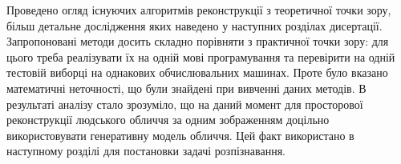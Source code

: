 \chapterConclusion

Проведено огляд існуючих алгоритмів реконструкції
з теоретичної точки зору,
більш детальне дослідження яких наведено у наступних розділах дисертації.
Запропоновані методи досить складно порівняти з практичної точки зору:
для цього треба реалізувати їх на одній мові програмування
та перевірити на одній тестовій виборці на однакових обчислювальних машинах.
Проте було вказано математичні неточності,
що були знайдені при вивченні даних методів.
В результаті аналізу стало зрозуміло,
що на даний момент
для просторової реконструкції людського обличчя за одним зображенням
доцільно використовувати генеративну модель обличчя.
Цей факт використано в наступному розділі для постановки задачі розпізнавання.
